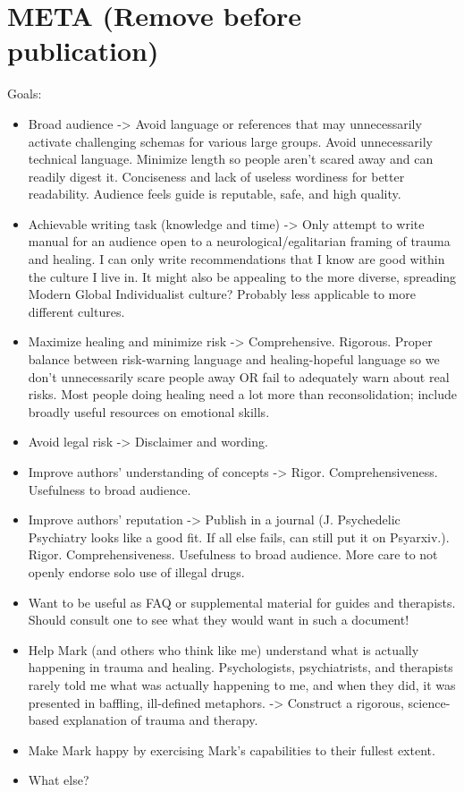 \documentclass[12pt,letterpaper]{article}
\begin{document}
\section*{META (Remove before publication)}
Goals:
\begin{itemize}
    \item Broad audience -> Avoid language or references that may unnecessarily activate challenging schemas for various large groups. Avoid unnecessarily technical language. Minimize length so people aren't scared away and can readily digest it. Conciseness and lack of useless wordiness for better readability. Audience feels guide is reputable, safe, and high quality.
    \item Achievable writing task (knowledge and time) -> Only attempt to write manual for an audience open to a neurological/egalitarian framing of trauma and healing. I can only write recommendations that I know are good within the culture I live in. It might also be appealing to the more diverse, spreading Modern Global Individualist culture? Probably less applicable to more different cultures.
    \item Maximize healing and minimize risk -> Comprehensive. Rigorous. Proper balance between risk-warning language and healing-hopeful language so we don't unnecessarily scare people away OR fail to adequately warn about real risks. Most people doing healing need a lot more than reconsolidation; include broadly useful resources on emotional skills.
    \item Avoid legal risk -> Disclaimer and wording.
    \item Improve authors' understanding of concepts -> Rigor. Comprehensiveness. Usefulness to broad audience.
    \item Improve authors' reputation -> Publish in a journal (J. Psychedelic Psychiatry looks like a good fit. If all else fails, can still put it on Psyarxiv.). Rigor. Comprehensiveness. Usefulness to broad audience. More care to not openly endorse solo use of illegal drugs.
    \item Want to be useful as FAQ or supplemental material for guides and therapists. Should consult one to see what they would want in such a document!
    \item Help Mark (and others who think like me) understand what is actually happening in trauma and healing. Psychologists, psychiatrists, and therapists rarely told me what was actually happening to me, and when they did, it was presented in baffling, ill-defined metaphors. -> Construct a rigorous, science-based explanation of trauma and therapy.
    \item Make Mark happy by exercising Mark's capabilities to their fullest extent.
    \item What else? 
\end{itemize}
\end{document}
